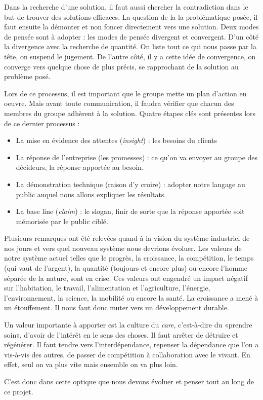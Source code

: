 Dans la recherche d'une solution, il faut aussi chercher la contradiction dans le but de trouver des solutions efficaces. La question de la la problématique posée, il faut ensuite la démonter et non foncer directement vers une solution.
Deux modes de pensée sont à adopter : les modes de pensée divergent et convergent. D'un côté la divergence avec la recherche de quantité. On liste tout ce qui nous passe par la tête, on suspend le jugement. De l'autre côté, il y a cette idée de convergence, on converge vers quelque chose de plus précis, se rapprochant de la solution au problème posé.

Lors de ce processus, il est important que le groupe mette un plan d'action en oeuvre. Mais avant toute communication, il faudra vérifier que chacun des membres du groupe adhèrent à la solution. Quatre étapes clés sont présentes lors de ce dernier processus :
\begin{itemize}
\item La mise en évidence des attentes (\emph{insight}) : les besoins du clients
\item La réponse de l'entreprise (les promesses) : ce qu'on va envoyer au groupe des décideurs, la réponse apportée au besoin.
\item La démonstration technique (raison d'y croire) : adopter notre langage au public auquel nous allons expliquer les résultats.
\item La base line (\emph{claim}) : le slogan, finir de sorte que la réponse apportée soit mémorisée par le public ciblé.
\end{itemize}

Plusieurs remarques ont été relevées quand à la vision du système industriel de nos jours et vers quel nouveau système nous devrions évoluer.
Les valeurs de notre système actuel telles que le progrès, la croissance, la compétition, le temps (qui vaut de l'argent), la quantité (toujours et encore plus) ou encore l'homme séparée de la nature, sont en crise. Ces valeurs ont engendré un impact négatif sur l'habitation, le travail, l'alimentation et l'agriculture, l'énergie, l'environnement, la science, la mobilité ou encore la santé. La croissance a mené à un étouffement. Il nous faut donc muter vers un développement durable.

Un valeur importante à apporter est la culture du \emph{care}, c'est-à-dire du «prendre soin», d'avoir de l'intérêt en le sens des choses. Il faut arrêter de détruire et régénérer.
Il faut tendre vers l'interdépendance, repenser la dépendance que l'on a vis-à-vis des autres, de passer de compétition à collaboration avec le vivant. En effet, seul on va plus vite mais ensemble on va plus loin.

C'est donc dans cette optique que nous devons évoluer et penser tout au long de ce projet.
